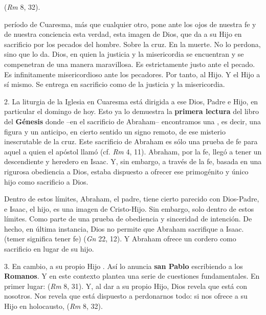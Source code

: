 \begin{body}
 (\textit{Rm} 8, 32).

 período de Cuaresma, más que cualquier otro, pone ante los ojos de nuestra fe y de nuestra conciencia esta verdad, esta imagen de Dios, que da a su Hijo en sacrificio por los pecados del hombre. Sobre la cruz. En la muerte. No lo perdona, sino que lo da. Dios, en quien la justicia y la misericordia se encuentran y se compenetran de una manera maravillosa. Es estrictamente justo ante el pecado. Es infinitamente misericordioso ante los pecadores. Por tanto,  al Hijo. Y el Hijo  a sí mismo. Se entrega en sacrificio como  de la justicia y la misericordia.

2. La liturgia de la Iglesia en Cuaresma está dirigida a ese Dios, Padre e Hijo, en particular el domingo de hoy. Esto ya lo demuestra la \textbf{primera lectura} del libro del \textbf{Génesis} donde –en el sacrificio de Abraham– encontramos una , es decir, una figura y un anticipo, en cierto sentido un signo remoto, de ese misterio inescrutable de la cruz. Este sacrificio de Abraham es sólo una prueba de fe para aquel a quien el apóstol llamó  (cf. \textit{Rm} 4, 11). Abraham, por la fe, llegó a tener un descendiente y heredero en Isaac. Y, sin embargo, a través de la fe, basada en una rigurosa obediencia a Dios, estaba dispuesto a ofrecer ese primogénito y único hijo como sacrificio a Dios.

Dentro de estos límites, Abraham, el padre, tiene cierto parecido con Dios-Padre, e Isaac, el hijo, es una imagen de Cristo-Hijo. Sin embargo, solo dentro de estos límites. Como parte de una prueba de obediencia y sinceridad de intención. De hecho, en última instancia, Dios no permite que Abraham sacrifique a Isaac.  (temer significa tener fe)  (\textit{Gn} 22, 12). Y Abraham ofrece un cordero como sacrificio en lugar de su hijo.

3. En cambio, a su propio Hijo . Así lo anuncia \textbf{san Pablo} escribiendo a los \textbf{Romanos}. Y en este contexto plantea una serie de cuestiones fundamentales. En primer lugar:  (\textit{Rm} 8, 31). Y, al dar a su propio Hijo, Dios revela que está con nosotros. Nos revela que está dispuesto a perdonarnos todo: si nos ofrece a su Hijo en holocausto,  (\textit{Rm} 8, 32).


\end{body}
